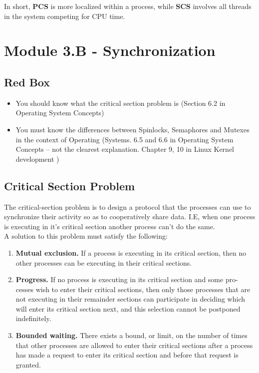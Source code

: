 \documentclass{article}
\begin{document}
In short, {\bf PCS} is more localized within a process, while {\bf SCS} involves all threads in the system competing for CPU time.





\section{Module 3.B - Synchronization}
\subsection{Red Box}
\begin{itemize}
    \item You should know what the critical section problem is (Section 6.2 in Operating System Concepts)
    \item You must know the differences between Spinlocks, Semaphores and Mutexes in the context of Operating
    (Systems. 6.5 and 6.6 in Operating System Concepts – not the clearest explanation. Chapter 9, 10 in Linux Kernel
    development )
\end{itemize}



\subsection{Critical Section Problem}

The critical-section problem is to design a protocol that the processes can use to 
synchronize their activity so as to cooperatively share data. I.E, when one process is executing in it's
critical section another process can't do the same.
\\
A solution to this problem must satisfy the following:

\begin{enumerate}
    \item {\bf Mutual exclusion.} If a process is executing in its critical section, then no
    other processes can be executing in their critical sections.
    \item {\bf Progress.} If no process is executing in its critical section and some pro-
    cesses wish to enter their critical sections, then only those processes that
    are not executing in their remainder sections can participate in deciding which 
    will enter its critical section next, and this selection cannot be
    postponed indefinitely.
    \item {\bf Bounded waiting.} There exists a bound, or limit, on the number of times
    that other processes are allowed to enter their critical sections after a
    process has made a request to enter its critical section and before that
    request is granted.
\end{enumerate}
\end{document}
